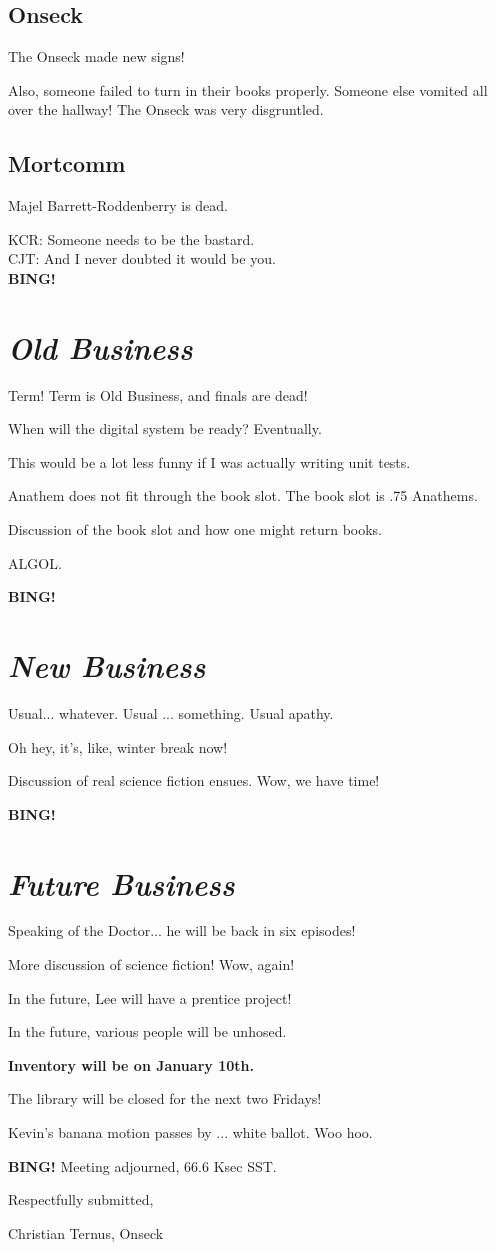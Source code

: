 \documentclass[10pt]{article}
\newcommand{\bing}{{\bf BING!} }
\newcommand{\goto}[1]{\bing \vskip 12pt \section*{{\em{#1}}}}
\begin{document}
\subsection*{Onseck}

The Onseck made new signs!

Also, someone failed to turn in their books properly.  Someone else
vomited all over the hallway!  The Onseck was very disgruntled.

\subsection*{Mortcomm}

Majel Barrett-Roddenberry is dead.

KCR:  Someone needs to be the bastard.\\
CJT:  And I never doubted it would be you.\\

\goto{Old Business}

Term!  Term is Old Business, and finals are dead!

When will the digital system be ready?  Eventually.

This would be a lot less funny if I was actually writing unit tests.

Anathem does not fit through the book slot.  The book slot is .75 Anathems.

Discussion of the book slot and how one might return books.

ALGOL.

\goto{New Business}

Usual... whatever.  Usual ... something.  Usual apathy.

Oh hey, it's, like, winter break now!

Discussion of real science fiction ensues.  Wow, we have time!

\goto{Future Business}

Speaking of the Doctor... he will be back in six episodes!

More discussion of science fiction!  Wow, again!

In the future, Lee will have a prentice project!

In the future, various people will be unhosed.

\textbf{Inventory will be on January 10th.}

The library will be closed for the next two Fridays!

Kevin's banana motion passes by ... white ballot.  Woo hoo.

\bing
\noindent
Meeting adjourned, 66.6 Ksec SST.

\vspace{18pt}

\centerline{Respectfully submitted,}
\centerline{Christian Ternus, Onseck}
\end{document}
